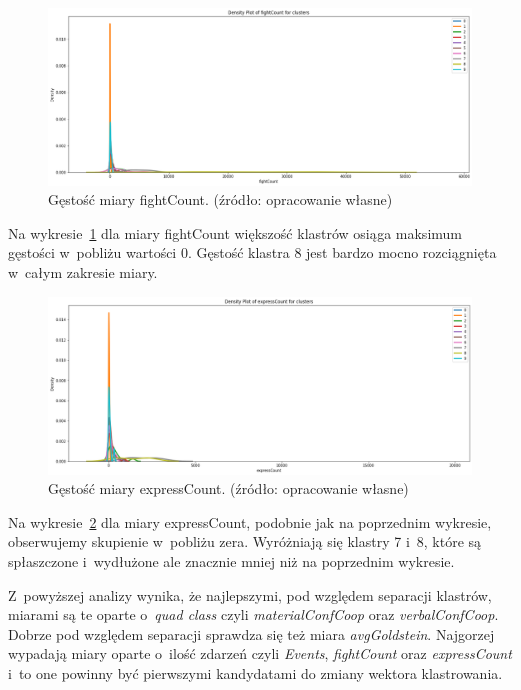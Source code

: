 \documentclass[11pt]{report}
\begin{document}
    \begin{figure}[!htp]
        \centering
        \includegraphics[width=\linewidth]{fig/CLUST/density_fightCount.png}
        \caption{Gęstość miary fightCount. (źródło: opracowanie własne)}
        \label{fig:density_fightcount}
    \end{figure}
    Na wykresie~\ref{fig:density_fightcount} dla miary fightCount większość klastrów osiąga maksimum gęstości w~pobliżu wartości 0.
    Gęstość klastra 8 jest bardzo mocno rozciągnięta w~całym zakresie miary.

    \begin{figure}[!htp]
        \centering
        \includegraphics[width=\linewidth]{fig/CLUST/density_expressCount.png}
        \caption{Gęstość miary expressCount. (źródło: opracowanie własne)}
        \label{fig:density_expresscount}
    \end{figure}
    Na wykresie~\ref{fig:density_expresscount} dla miary expressCount, podobnie jak na poprzednim wykresie, obserwujemy skupienie w~pobliżu zera.
    Wyróżniają się klastry 7 i~8, które są spłaszczone i~wydłużone ale znacznie mniej niż na poprzednim wykresie.

    Z~powyższej analizy wynika, że najlepszymi, pod względem separacji klastrów, miarami są te oparte o~\textit{quad class} czyli \textit{materialConfCoop} oraz \textit{verbalConfCoop}.
    Dobrze pod względem separacji sprawdza się też miara \textit{avgGoldstein}.
    Najgorzej wypadają miary oparte o~ilość zdarzeń czyli \textit{Events}, \textit{fightCount} oraz \textit{expressCount} i~to one powinny być pierwszymi kandydatami do zmiany wektora klastrowania.
\end{document}
